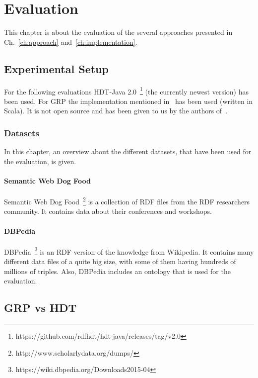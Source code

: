 \chapter{Evaluation}\label{ch:evaluation}

This chapter is about the evaluation of the several approaches presented in Ch.~\ref{ch:approach} and~\ref{ch:implementation}.

\section{Experimental Setup}

For the following evaluations HDT-Java 2.0~\footnote{\label{foot:1}https://github.com/rdfhdt/hdt-java/releases/tag/v2.0} (the currently newest version) has been used. For GRP the implementation mentioned in~\cite{maneth} has been used (written in Scala). It is not open source and has been given to us by the authors of~\cite{maneth}.

\subsection{Datasets}

In this chapter, an overview about the different datasets, that have been used for the evaluation, is given.

\subsubsection{Semantic Web Dog Food}

Semantic Web Dog Food~\footnote{http://www.scholarlydata.org/dumps/} is a collection of RDF files from the RDF researchers community. It contains data about their conferences and workshops.

\subsubsection{DBPedia}

DBPedia~\footnote{https://wiki.dbpedia.org/Downloads2015-04} is an RDF version of the knowledge from Wikipedia. It contains many different data files of a quite big size, with some of them having hundreds of millions of triples. Also, DBPedia includes an ontology that is used for the evaluation.

\section{GRP vs HDT}\label{sec:evaluationHDTvsGRP}

